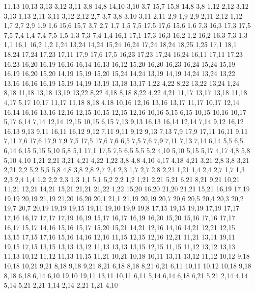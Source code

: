 11,13
10,13
3,13
3,12
3,11
%
3,8
14,8
14,10
3,10
%
3,7
15,7
15,8
14,8
3,8
%
1,12
2,12
3,12
3,13
1,13
%
2,11
3,11
3,12
2,12
%
2,7
3,7
3,8
3,10
3,11
2,11
2,9
%
1,9
2,9
2,11
2,12
1,12
%
1,7
2,7
2,9
1,9
%
1,6
15,6
15,7
3,7
2,7
1,7
%
1,5
7,5
17,5
17,6
15,6
1,6
%
7,3
16,3
17,3
17,5
7,5
7,4
%
1,4
7,4
7,5
1,5
%
1,3
7,3
7,4
1,4
%
16,1
17,1
17,3
16,3
16,2
%
1,2
16,2
16,3
7,3
1,3
%
1,1
16,1
16,2
1,2
1,24
13,24
14,24
15,24
16,24
17,24
18,24
18,25
1,25
%
17,1
18,1
18,24
17,24
17,23
17,11
17,9
17,6
17,5
%
16,23
17,23
17,24
16,24
%
16,11
17,11
17,23
16,23
16,20
16,19
16,16
16,14
16,13
16,12
%
15,20
16,20
16,23
16,24
15,24
%
15,19
16,19
16,20
15,20
%
14,19
15,19
15,20
15,24
14,24
%
13,19
14,19
14,24
13,24
13,22
%
13,16
16,16
16,19
15,19
14,19
13,19
13,18
13,17
%
1,22
4,22
8,22
13,22
13,24
1,24
%
8,18
11,18
13,18
13,19
13,22
8,22
%
4,18
8,18
8,22
4,22
4,21
%
11,17
13,17
13,18
11,18
%
4,17
5,17
10,17
11,17
11,18
8,18
4,18
%
10,16
12,16
13,16
13,17
11,17
10,17
%
12,14
16,14
16,16
13,16
12,16
12,15
%
10,15
12,15
12,16
10,16
%
5,15
6,15
10,15
10,16
10,17
5,17
%
6,14
7,14
12,14
12,15
10,15
6,15
%
7,13
9,13
16,13
16,14
12,14
7,14
%
9,12
16,12
16,13
9,13
%
9,11
16,11
16,12
9,12
%
7,11
9,11
9,12
9,13
7,13
%
7,9
17,9
17,11
16,11
9,11
7,11
%
7,6
17,6
17,9
7,9
%
7,5
17,5
17,6
7,6
%
6,5
7,5
7,6
7,9
7,11
7,13
7,14
6,14
%
5,5
6,5
6,14
6,15
5,15
5,10
5,8
%
5,1
17,1
17,5
7,5
6,5
5,5
5,2
%
4,10
5,10
5,15
5,17
4,17
%
4,8
5,8
5,10
4,10
%
1,21
2,21
3,21
4,21
4,22
1,22
%
3,8
4,8
4,10
4,17
4,18
4,21
3,21
%
2,8
3,8
3,21
2,21
%
2,2
5,2
5,5
5,8
4,8
3,8
2,8
2,7
2,4
2,3
%
1,7
2,7
2,8
2,21
1,21
%
1,4
2,4
2,7
1,7
%
1,3
2,3
2,4
1,4
%
1,2
2,2
2,3
1,3
%
1,1
5,1
5,2
2,2
1,2
1,21
2,21
5,21
6,21
8,21
9,21
10,21
11,21
12,21
14,21
15,21
21,21
21,22
1,22
%
15,20
16,20
21,20
21,21
15,21
%
16,19
17,19
19,19
20,19
21,19
21,20
16,20
%
20,1
21,1
21,19
20,19
20,7
20,6
20,5
20,4
20,3
20,2
%
19,7
20,7
20,19
19,19
19,15
19,11
19,10
19,9
19,8
%
17,15
19,15
19,19
17,19
17,17
17,16
%
16,17
17,17
17,19
16,19
%
15,17
16,17
16,19
16,20
15,20
%
15,16
17,16
17,17
16,17
15,17
%
14,16
15,16
15,17
15,20
15,21
14,21
%
12,16
14,16
14,21
12,21
%
12,15
13,15
17,15
17,16
15,16
14,16
12,16
%
11,15
12,15
12,16
12,21
11,21
%
13,11
19,11
19,15
17,15
13,15
13,13
13,12
%
11,13
13,13
13,15
12,15
11,15
%
11,12
13,12
13,13
11,13
%
10,12
11,12
11,13
11,15
11,21
10,21
10,18
%
10,11
13,11
13,12
11,12
10,12
%
9,18
10,18
10,21
9,21
%
8,18
9,18
9,21
8,21
%
6,18
8,18
8,21
6,21
%
6,11
10,11
10,12
10,18
9,18
8,18
6,18
6,14
%
6,10
19,10
19,11
13,11
10,11
6,11
%
5,14
6,14
6,18
6,21
5,21
%
2,14
4,14
5,14
5,21
2,21
%
1,14
2,14
2,21
1,21
%
4,10
